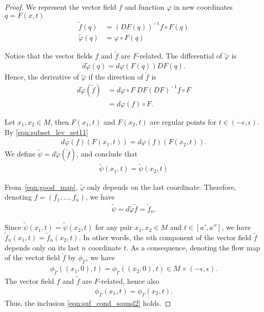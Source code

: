\begin{proof}
We represent the vector field $f$ and function $\varphi$ in new coordinates $q = F(x,t)$
\begin{subequations}
\begin{align}
\tilde f (q) & = (D F(q))^{-1}f \circ F(q) \\
\tilde \varphi (q) & = \varphi\circ F(q) \label{eqn:varphi_tilde}
\end{align}
\end{subequations}

Notice that the vector fields $f$ and $\tilde f$ are $F$-related. The differential of $\tilde \varphi$ is
\begin{align}
d\tilde{\varphi}(q)=d\varphi(F(q))DF(q).
\end{align}
Hence, the derivative of $\tilde \varphi$ if the direction of $\tilde f$ is
\begin{align}
d\tilde{\varphi}(\tilde{f})&=d \varphi \circ F ~ DF (DF)^{-1} f \circ F\\
&=d\varphi(f) \circ F.
\end{align}

Let $x_{1},x_{2}\in M$, then $F(x_1,t)$ and $F(x_2,t)$ are regular points for $t \in (-\epsilon, \epsilon)$. By \eqref{eqn:subset_lev_set11}
\begin{align}
d \varphi (f)(F(x_{1},t)) = d\varphi (f)(F(x_{2},t)).
\end{align}
We define $\tilde{\psi}=d\tilde{\varphi}(\tilde{f})$, and conclude that
\begin{align}
\tilde{\psi}(x_1,t) = \tilde{\psi}(x_2,t)
\end{align}

From~\eqref{eqn:good_map}, $\tilde{\varphi}$ only depends on the last coordinate. Therefore, denoting $f = (f_1, \hdots, f_n)$, we have
\begin{align}
\tilde{\psi} = d\tilde{\varphi}\tilde{f}=\tilde{f}_{n}.
\end{align}

Since $\tilde \psi (x_1,t) = \tilde \psi(x_2,t)$ for any pair $x_1, x_2 \in M$ and $t \in [a',a'']$, we have $\tilde f_n(x_1,t) = \tilde f_n(x_2,t)$. In other words, the $n$th component of the vector field $\tilde f$ depends only on its last $n$ coordinate $t$. As a consequence, denoting the flow map of the vector field $\tilde f$ by $\phi_{\tilde \Gamma}$, we have
\begin{align}
\phi_{\tilde \Gamma} ((x_1,0),t ) = \phi_{\tilde \Gamma} ((x_2,0),t ) \in M \times (-\epsilon, \epsilon).
\end{align}
The vector field $f$ and $\tilde f$ are $F$-related, hence also
\begin{align}
\phi_{\Gamma} (x_1,t ) = \phi_{\Gamma} (x_2,t ).
\end{align}
Thus,  the inclusion \eqref{eqn:suf_cond_sound2} holds.
\end{proof}

